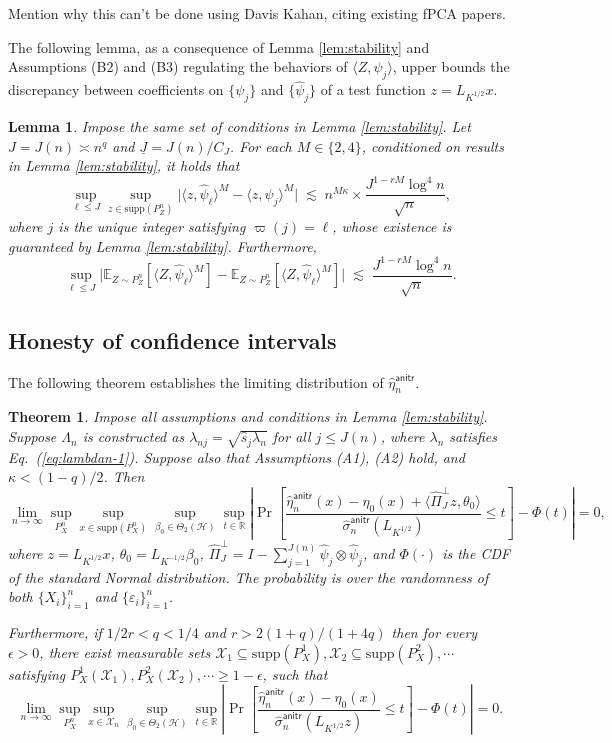 \documentclass[11pt,a4paper]{article}
\renewcommand{\hat}{\widehat}
\theoremstyle{definition}
\theoremstyle{plain}
\newtheorem{theorem}{Theorem}[section]
\newtheorem{lemma}{Lemma}[section]
\theoremstyle{remark}
\newcommand{\supp}{\mathrm{supp}}
\newcommand{\mX}{\mathcal X}
\newcommand{\mH}{\mathcal H}
\newcommand{\anitr}{\mathsf{anitr}}
\newcommand{\und}{\underline}
\begin{document}
{\color{red} Mention why this can't be done using Davis Kahan, citing existing fPCA papers.}


The following lemma, as a consequence of Lemma \ref{lem:stability} and Assumptions (B2) and (B3) regulating the behaviors of $\langle Z,\psi_j\rangle$,
upper bounds the discrepancy between coefficients on $\{\psi_j\}$ and $\{\hat\psi_j\}$ of a test function $z=L_{K^{1/2}}x$.
\begin{lemma}
Impose the same set of conditions in Lemma \ref{lem:stability}.
Let $J=J(n)\asymp n^q$ and $\und J=J(n)/C_J$.
For each $M\in\{2,4\}$, conditioned on results in Lemma \ref{lem:stability},
it holds that
$$
\sup_{\ell\leq J}\sup_{z\in\supp(P_Z^n)}\big|\langle z,\hat\psi_\ell\rangle^M - \langle z,\psi_j\rangle^M\big|\; \lesssim\; n^{M\kappa}\times \frac{J^{1-rM}\log^4 n}{\sqrt{n}},
$$
where $j$ is the unique integer satisfying $\varpi(j)=\ell$, whose existence is guaranteed by Lemma \ref{lem:stability}.
Furthermore, 
$$
\sup_{\ell\leq J}\bigg|\mathbb E_{Z\sim P_Z^n}\left[\langle Z,\hat\psi_\ell\rangle^M\right] -\mathbb E_{Z\sim P_Z^n}\left[\langle Z,\hat\psi_\ell\rangle^M\right]\bigg|
\;\lesssim\;\frac{J^{1-rM}\log^4 n}{\sqrt{n}}.
$$
\label{lem:zpsi-stability}
\end{lemma}

\subsection{Honesty of confidence intervals}

The following theorem establishes the limiting distribution of $\hat\eta_n^\anitr$.
\begin{theorem}
Impose all assumptions and conditions in Lemma \ref{lem:stability}. Suppose $\Lambda_n$ is constructed as $\lambda_{nj}=\sqrt{\hat s_j\lambda_n}$ for all $j\leq J(n)$,
where $\lambda_n$ satisfies Eq.~(\ref{eq:lambdan-1}). Suppose also that Assumptions (A1), (A2) hold, and $\kappa<(1-q)/2$. Then 
$$
\lim_{n\to\infty} \sup_{P_X^n}\sup_{x\in\supp(P_X^n)}\sup_{\beta_0\in\Theta_2(\mH)}\sup_{t\in\mathbb R}\left|\Pr\left[\frac{\hat\eta_n^{\anitr}(x)-\eta_0(x)+\langle\hat\Pi_J^\perp z, \theta_0\rangle}{\hat\sigma_n^\anitr(L_{K^{1/2}})}\leq t\right] - \Phi(t)\right| = 0,
$$
where $z=L_{K^{1/2}}x$, $\theta_0=L_{K^{-1/2}}\beta_0$, $\hat\Pi_J^\perp = I - \sum_{j=1}^{J(n)}\hat\psi_j\otimes\hat\psi_j$, and $\Phi(\cdot)$ is the CDF of the standard Normal distribution.
The probability is over the randomness of both $\{X_i\}_{i=1}^n$ and $\{\varepsilon_i\}_{i=1}^n$. 

Furthermore, if $1/2r<q<1/4$ and $r>2(1+q)/(1+4q)$ then for every $\epsilon>0$, there exist measurable sets $\mX_1\subseteq\supp(P_X^1),\mX_2\subseteq\supp(P_X^2),\cdots$ satisfying $P_X^1(\mX_1),P_X^2(\mX_2),\cdots\geq 1-\epsilon$,
such that
$$
\lim_{n\to\infty} \sup_{P_X^n}\sup_{x\in\mX_n}\sup_{\beta_0\in\Theta_2(\mH)}\sup_{t\in\mathbb R}\left|\Pr\left[\frac{\hat\eta_n^{\anitr}(x)-\eta_0(x)}{\hat\sigma_n^\anitr(L_{K^{1/2}}z)}\leq t\right] - \Phi(t)\right| = 0.
$$
\label{thm:anitr-limiting}
\end{theorem}
\end{document}
